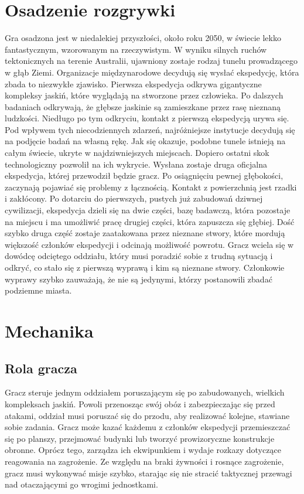 \documentclass[licencjacka]{pracamgr}
\begin{document}
  \section{Osadzenie rozgrywki}
  Gra osadzona jest w niedalekiej przyszłości, około roku 2050, w świecie lekko fantastycznym, wzorowanym na
  rzeczywistym. W wyniku silnych ruchów tektonicznych na terenie Australii, ujawniony zostaje rodzaj tunelu
  prowadzącego w głąb Ziemi. Organizacje międzynarodowe decydują się wysłać ekspedycję, która zbada to niezwykłe
  zjawisko. Pierwsza ekspedycja odkrywa gigantyczne kompleksy jaskiń, które wyglądają na stworzone przez człowieka.
  Po dalszych badaniach odkrywają, że głębsze jaskinie są zamieszkane przez rasę nieznaną ludzkości. Niedługo
  po tym odkryciu, kontakt z pierwszą ekspedycją urywa się. Pod wpływem tych niecodziennych zdarzeń, najróżniejsze
  instytucje decydują się na podjęcie badań na własną rękę. Jak się okazuje, podobne tunele istnieją na całym świecie,
  ukryte w najdziwniejszych miejscach. Dopiero ostatni skok technologiczny pozwolił na ich wykrycie. Wysłana zostaje
  druga oficjalna ekspedycja, której przewodził będzie gracz. Po osiągnięciu pewnej głębokości, zaczynają pojawiać się
  problemy z łącznością. Kontakt z powierzchnią jest rzadki i zakłócony. Po dotarciu do pierwszych, pustych już zabudowań
  dziwnej cywilizacji, ekspedycja dzieli się na dwie części, bazę badawczą, która pozostaje na miejscu i ma umożliwić
  pracę drugiej części, która zapuszcza się głębiej. Dość szybko druga część zostaje zaatakowana przez nieznane stwory,
  które mordują większość członków ekspedycji i odcinają możliwość powrotu. Gracz wciela się w dowódcę odciętego
  oddziału, który musi poradzić sobie z trudną sytuacją i odkryć, co stało się z pierwszą wyprawą i kim są nieznane
  stwory. Członkowie wyprawy szybko zauważają, że nie są jedynymi, którzy postanowili zbadać podziemne miasta.

  \section{Mechanika}
    \subsection{Rola gracza}
    Gracz steruje jednym oddziałem poruszającym się po zabudowanych, wielkich kompleksach jaskiń. Powoli przenosząc
    swój obóz i zabezpieczając się przed atakami, oddział musi poruszać się do przodu, aby realizować kolejne, stawiane
    sobie zadania. Gracz może kazać każdemu z członków ekspedycji przemieszczać się po planszy, przejmować budynki lub
    tworzyć prowizoryczne konstrukcje obronne. Oprócz tego, zarządza ich ekwipunkiem i wydaje rozkazy dotyczące reagowania
    na zagrożenie. Ze względu na braki żywności i rosnące zagrożenie, gracz musi wykonywać misje szybko, starając się
    nie stracić taktycznej przewagi nad otaczającymi go wrogimi jednostkami.
\end{document}
